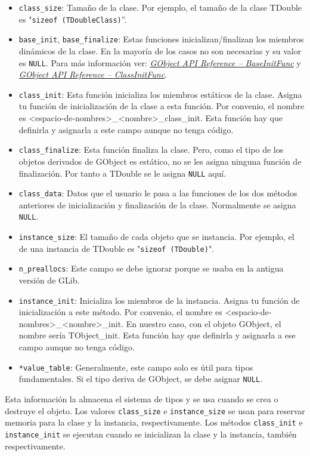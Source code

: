 \begin{itemize}
  \tightlist
\item \texttt{class\_size}: Tamaño de la clase. Por ejemplo, el tamaño de la clase
  \textsf{TDouble} es "\texttt{sizeof (TDoubleClass)}''.
\item \texttt{base\_init}, \texttt{base\_finalize}: Estas funciones inicializan/finalizan
  los miembros dinámicos de la clase. En la mayoría de los casos no son necesarias y
  su valor es \texttt{NULL}.
  Para más información ver:
  \href{https://docs.gtk.org/gobject/callback.BaseInitFunc.html}
  {\textit{GObject API Reference -- BaseInitFunc}} y
  \href{https://docs.gtk.org/gobject/callback.ClassInitFunc.html}
  {\textit{GObject API Reference -- ClassInitFunc}}.
\item \texttt{class\_init}: Esta función inicializa los miembros estáticos de la clase. Asigna tu función de
  inicialización de la clase a esta función.
  Por convenio, el nombre es \textsf{<espacio-de-nombres>\_<nombre>\_class\_init}.
  Esta función hay que definirla y asignarla a este campo aunque no tenga código.
\item \texttt{class\_finalize}: Esta función finaliza la clase. Pero, como el tipo de los objetos derivados de
  \textsf{GObject} es estático, no se les asigna ninguna función de finalización. Por tanto a \textsf{TDouble}
  se le asigna \texttt{NULL} aquí.
\item \texttt{class\_data}: Datos que el usuario le pasa a las funciones de los dos métodos anteriores
  de inicialización y finalización de la clase. Normalmente se asigna \texttt{NULL}.
\item \texttt{instance\_size}: El tamaño de cada objeto que se instancia. Por ejemplo, el de una instancia
  de \textsf{TDouble} es "\texttt{sizeof (TDouble)}".
\item \texttt{n\_preallocs}: Este campo se debe ignorar porque se usaba en la antigua versión de \textsf{GLib}.
\item \texttt{instance\_init}: Inicializa los miembros de la instancia. Asigna tu función de inicialización a este
  método. Por convenio, el nombre es \textsf{<espacio-de-nombres>\_<nombre>\_init}. En nuestro caso, con
  el objeto \textsf{GObject}, el nombre sería \textsf{TObject\_init}.
  Esta función hay que definirla y asignarla a ese campo aunque no tenga código.
\item \texttt{*value\_table}:  Generalmente, este campo solo es útil para tipos fundamentales. Si el tipo deriva
  de \textsf{GObject}, se debe asignar \texttt{NULL}.
\end{itemize}
Esta información la almacena el sistema de tipos y se usa cuando se crea o destruye el objeto.
Los valores \texttt{class\_size} e \texttt{instance\_size} se usan para reservar memoria para la clase y la instancia,
respectivamente. Los métodos \texttt{class\_init} e \texttt{instance\_init} se ejecutan cuando se inicializan
la clase y la instancia, también respectivamente.

